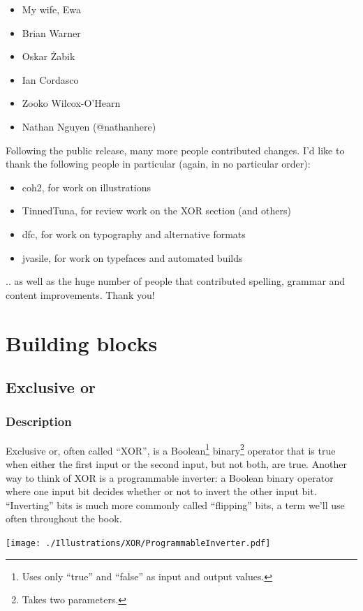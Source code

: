 \documentclass[11pt,ebook,table,dvipsnames]{memoir}
\begin{document}
\begin{itemize}
\item My wife, Ewa
\item Brian Warner
\item Oskar Żabik
\item Ian Cordasco
\item Zooko Wilcox-O'Hearn
\item Nathan Nguyen (@nathanhere)
\end{itemize}

Following the public release, many more people contributed changes.
I'd like to thank the following people in particular (again, in no
particular order):

\begin{itemize}
\item coh2, for work on illustrations
\item TinnedTuna, for review work on the XOR section (and others)
\item dfc, for work on typography and alternative formats
\item jvasile, for work on typefaces and automated builds
\end{itemize}

.. as well as the huge number of people that contributed spelling,
grammar and content improvements. Thank you!
\part{Building blocks}
\label{sec-2}
\chapter{Exclusive or}
\label{sec-2-1}
\section{Description}
\label{sec-2-1-1}
Exclusive or, often called \enquote{XOR}, is a Boolean\footnote{Uses only \enquote{true}
and \enquote{false} as input and output values.} binary\footnote{Takes two
parameters.} operator that is true when either the first input or the
second input, but not both, are true. Another way to think of XOR is a
programmable inverter: a Boolean binary operator where one input bit
decides whether or not to invert the other input bit. \enquote{Inverting} bits
is much more commonly called \enquote{flipping} bits, a term we'll use often
throughout the book.

\texttt{[image: ./Illustrations/XOR/ProgrammableInverter.pdf]}
\end{document}
